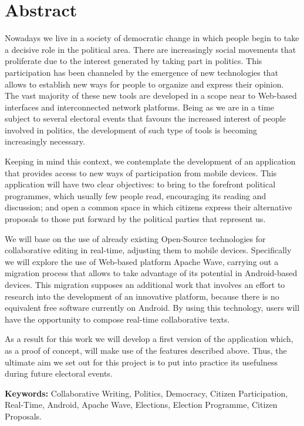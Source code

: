 \newpage
\renewcommand{\thepage}{\Roman{page}}
\setcounter{page}{9}
\chapter*{Abstract}
Nowadays we live in a society of democratic change in which people begin to take a decisive role  in the political area. There are increasingly social movements that proliferate due to the interest generated by taking part in politics. This participation has been channeled by the emergence of new technologies that allows to establish new ways for people to organize and express their opinion. The vast majority of these new tools are developed in a scope near to Web-based interfaces and interconnected network platforms. Being as we are in a time subject to several electoral events that favours the increased interest of people involved in politics, the development of such type of tools is becoming increasingly necessary.

Keeping in mind this context, we contemplate the development of an application that provides access to new ways of participation from mobile devices. This application will have two clear objectives: to bring to the forefront political programmes, which usually few people read, encouraging its reading and discussion; and open a common space in which citizens express their alternative proposals to those put forward by the political parties that represent us.
 
We will base on the use of already existing Open-Source technologies for collaborative editing in real-time, adjusting them to mobile devices. Specifically we will explore the use of Web-based platform Apache Wave, carrying out a migration process that allows to take advantage of its potential in Android-based devices. This migration supposes an additional work that involves an effort to research into the development of an innovative platform, because there is no equivalent free software currently on Android. By using this technology, users will have the opportunity to compose real-time collaborative texts.

As a result for this work we will develop a first version of the application which, as a proof of concept, will make use of the features described above. Thus, the ultimate aim we set out for this project is to put into practice its usefulness during future electoral events.

\vfill
{\bf Keywords:} {Collaborative Writing, Politics, Democracy, Citizen Participation, Real-Time, Android, Apache Wave, Elections, Election Programme, Citizen Proposals. }

